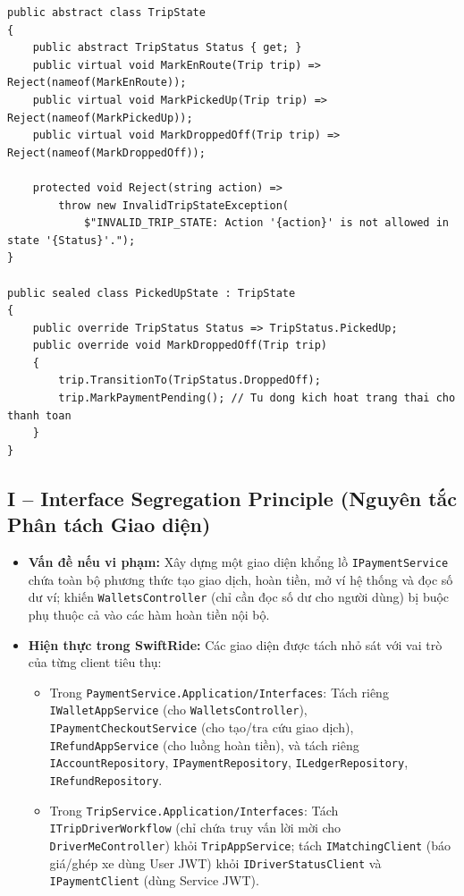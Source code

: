 \documentclass[12pt,a4paper]{article}
\begin{document}
\begin{lstlisting}[caption={LSP: Moi lop con cua TripState tuan thu tuyet doi hop dong bat bien tren Aggregate Trip}]
public abstract class TripState
{
    public abstract TripStatus Status { get; }
    public virtual void MarkEnRoute(Trip trip) => Reject(nameof(MarkEnRoute));
    public virtual void MarkPickedUp(Trip trip) => Reject(nameof(MarkPickedUp));
    public virtual void MarkDroppedOff(Trip trip) => Reject(nameof(MarkDroppedOff));

    protected void Reject(string action) =>
        throw new InvalidTripStateException(
            $"INVALID_TRIP_STATE: Action '{action}' is not allowed in state '{Status}'.");
}

public sealed class PickedUpState : TripState
{
    public override TripStatus Status => TripStatus.PickedUp;
    public override void MarkDroppedOff(Trip trip)
    {
        trip.TransitionTo(TripStatus.DroppedOff);
        trip.MarkPaymentPending(); // Tu dong kich hoat trang thai cho thanh toan
    }
}
\end{lstlisting}

\subsection{I -- Interface Segregation Principle (Nguyên tắc Phân tách Giao diện)}
\begin{itemize}[nosep]
    \item \textbf{Vấn đề nếu vi phạm:} Xây dựng một giao diện khổng lồ \texttt{IPaymentService} chứa toàn bộ phương thức tạo giao dịch, hoàn tiền, mở ví hệ thống và đọc số dư ví; khiến \texttt{WalletsController} (chỉ cần đọc số dư cho người dùng) bị buộc phụ thuộc cả vào các hàm hoàn tiền nội bộ.
    \item \textbf{Hiện thực trong SwiftRide:} Các giao diện được tách nhỏ sát với vai trò của từng client tiêu thụ:
    \begin{itemize}[nosep]
        \item Trong \texttt{PaymentService.Application/Interfaces}: Tách riêng \texttt{IWalletAppService} (cho \texttt{WalletsController}), \texttt{IPaymentCheckoutService} (cho tạo/tra cứu giao dịch), \texttt{IRefundAppService} (cho luồng hoàn tiền), và tách riêng \texttt{IAccountRepository}, \texttt{IPaymentRepository}, \texttt{ILedgerRepository}, \texttt{IRefundRepository}.
        \item Trong \texttt{TripService.Application/Interfaces}: Tách \texttt{ITripDriverWorkflow} (chỉ chứa truy vấn lời mời cho \texttt{DriverMeController}) khỏi \texttt{TripAppService}; tách \texttt{IMatchingClient} (báo giá/ghép xe dùng User JWT) khỏi \texttt{IDriverStatusClient} và \texttt{IPaymentClient} (dùng Service JWT).
    \end{itemize}
\end{itemize}
\end{document}
